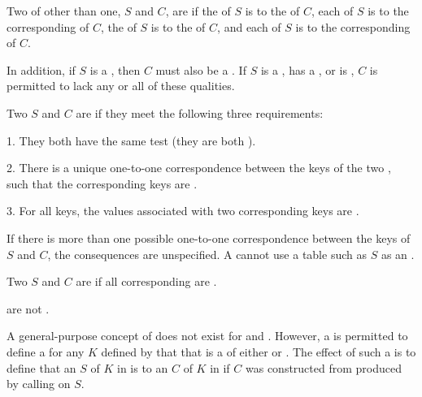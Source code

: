 Two  of  other than one, $S$ and $C$, are  if
     the  of $S$ is  to the  of $C$,
     each  of $S$ is  to 
      the corresponding  of $C$,
     the  of $S$ is  to
     the  of $C$,
 and each  of $S$ is  to
      the corresponding  of $C$.

In addition,
if $S$ is a , then $C$ must also be a .
If $S$ is a ,
       has a ,
    or is , 
$C$ is permitted to lack any or all of these qualities.


Two  $S$ and $C$ are  if they meet the following
three requirements:
 
\beginlist
\item{1.}  They both have the same test 
 	    (\eg they are both  ).
 
\item{2.}  There is a unique one-to-one correspondence between the keys of
           the two , such that the corresponding keys are 
	   .

\item{3.}  For all keys, the values associated with two corresponding keys
           are .
\endlist
 
If there is more than one possible one-to-one correspondence between
the keys of $S$ and $C$, the consequences are unspecified.  
A  cannot use a table such as $S$ as an
.
 
 
Two  $S$ and $C$ are  if all corresponding 
 are .

 
 are not .


A general-purpose concept of  does not exist for 
and .
However, a  is permitted to define a 
 for any  $K$ defined by that  that is
a  of either  or .
The effect of such a  is to define that an  $S$ of  $K$
in  is  to an  $C$ of  $K$
in  if $C$ was constructed from  produced by 
calling  on $S$.


